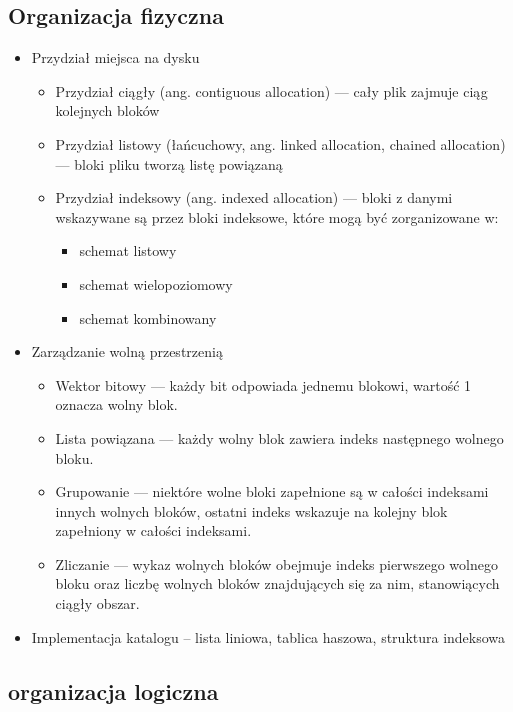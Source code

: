 \documentclass[main.tex]{subfiles}
\begin{document}
    \subsection{Organizacja fizyczna}
    \begin{itemize}
        \item Przydział miejsca na dysku
        \begin{itemize}
            \item Przydział ciągły (ang. contiguous allocation) — cały plik zajmuje ciąg kolejnych bloków
            \item Przydział listowy (łańcuchowy, ang. linked allocation, chained allocation) — bloki pliku tworzą listę powiązaną
            \item Przydział indeksowy (ang. indexed allocation) — bloki z danymi wskazywane są przez bloki indeksowe, które mogą być
            zorganizowane w:
            \begin{itemize}
                \item schemat listowy
                \item schemat wielopoziomowy
                \item schemat kombinowany
            \end{itemize}
        \end{itemize}
        \item Zarządzanie wolną przestrzenią
        \begin{itemize}
            \item Wektor bitowy — każdy bit odpowiada jednemu blokowi, wartość 1 oznacza wolny blok.
            \item Lista powiązana — każdy wolny blok zawiera indeks następnego wolnego bloku.
            \item Grupowanie — niektóre wolne bloki zapełnione są w całości indeksami innych wolnych bloków, ostatni indeks wskazuje na
            kolejny blok zapełniony w całości indeksami.
            \item Zliczanie — wykaz wolnych bloków obejmuje indeks pierwszego wolnego bloku oraz liczbę wolnych bloków znajdujących się za
            nim, stanowiących ciągły obszar.
        \end{itemize}
        \item Implementacja katalogu – lista liniowa, tablica haszowa, struktura indeksowa
    \end{itemize}

    \subsection{organizacja logiczna}
\end{document}
